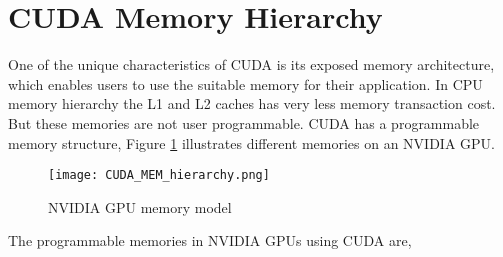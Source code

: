 \section{CUDA Memory Hierarchy}
One of the unique characteristics of CUDA is its exposed memory architecture, which enables users to use the suitable memory for their application. In CPU memory hierarchy the L1 and L2 caches has very less memory transaction cost. But these memories are not user programmable. CUDA has a programmable memory structure, Figure \ref{Figure:2.2} illustrates different memories on an NVIDIA GPU.
\begin{figure}[h!]
  \centering
  \texttt{[image: CUDA\_MEM\_hierarchy.png]}
  \caption{NVIDIA GPU memory model}
  \label{Figure:2.2}
\end{figure}
The programmable memories in NVIDIA GPUs using CUDA are,
